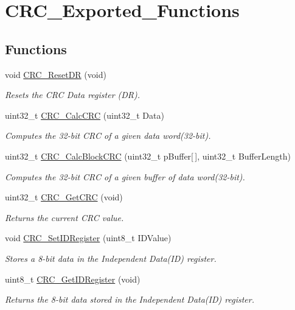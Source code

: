 \hypertarget{group___c_r_c___exported___functions}{}\section{C\+R\+C\+\_\+\+Exported\+\_\+\+Functions}
\label{group___c_r_c___exported___functions}
\subsection*{Functions}
\begin{DoxyCompactItemize}
\item 
void \mbox{\hyperlink{group___c_r_c___exported___functions_ga506467d5ef873a5a4ade4ae83cb110f6}{C\+R\+C\+\_\+\+Reset\+DR}} (void)
\begin{DoxyCompactList}\small\item\em Resets the C\+RC Data register (DR). \end{DoxyCompactList}\item 
uint32\+\_\+t \mbox{\hyperlink{group___c_r_c___exported___functions_ga5407fdbb8e8c9be6322cc8856ae5db3b}{C\+R\+C\+\_\+\+Calc\+C\+RC}} (uint32\+\_\+t Data)
\begin{DoxyCompactList}\small\item\em Computes the 32-\/bit C\+RC of a given data word(32-\/bit). \end{DoxyCompactList}\item 
uint32\+\_\+t \mbox{\hyperlink{group___c_r_c___exported___functions_gab15ebf620615c360048fb4f45b15fae6}{C\+R\+C\+\_\+\+Calc\+Block\+C\+RC}} (uint32\+\_\+t p\+Buffer\mbox{[}$\,$\mbox{]}, uint32\+\_\+t Buffer\+Length)
\begin{DoxyCompactList}\small\item\em Computes the 32-\/bit C\+RC of a given buffer of data word(32-\/bit). \end{DoxyCompactList}\item 
uint32\+\_\+t \mbox{\hyperlink{group___c_r_c___exported___functions_gab62db4561b0558f3c8ed53887fe7de8b}{C\+R\+C\+\_\+\+Get\+C\+RC}} (void)
\begin{DoxyCompactList}\small\item\em Returns the current C\+RC value. \end{DoxyCompactList}\item 
void \mbox{\hyperlink{group___c_r_c___exported___functions_ga769c9a42be57b972ae61bbada0f2e46a}{C\+R\+C\+\_\+\+Set\+I\+D\+Register}} (uint8\+\_\+t I\+D\+Value)
\begin{DoxyCompactList}\small\item\em Stores a 8-\/bit data in the Independent Data(\+I\+D) register. \end{DoxyCompactList}\item 
uint8\+\_\+t \mbox{\hyperlink{group___c_r_c___exported___functions_gaf869f6e9c3ca0ae0822cfad1abea7e5f}{C\+R\+C\+\_\+\+Get\+I\+D\+Register}} (void)
\begin{DoxyCompactList}\small\item\em Returns the 8-\/bit data stored in the Independent Data(\+I\+D) register. \end{DoxyCompactList}\end{DoxyCompactItemize}


